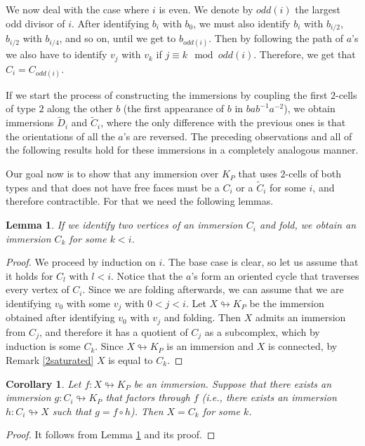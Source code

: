 \documentclass{amsart}
\theoremstyle{plain}
\newtheorem{lem}[thm]{Lemma}
\newtheorem{cor}[thm]{Corollary}
\theoremstyle{definition}
\theoremstyle{remark}
\numberwithin{equation}{section}
\begin{document}
We now deal with the case where $i$ is even.
We denote by $odd(i)$ the largest odd divisor of $i$.
After identifying $b_i$ with $b_0$, we must also identify $b_i$ with $b_{i/2}$, $b_{i/2}$ with $b_{i/4}$, and so on, until we get to $b_{odd(i)}$.
Then by following the path of $a$'s we also have to identify $v_j$ with $v_k$ if $j\equiv k \mod odd(i)$.
Therefore, we get that $C_i=C_{odd(i)}$.

If we start the process of constructing the immersions by coupling the first $2$-cells of type $2$ along the other $b$ (the first appearance of $b$ in $bab^{-1}a^{-2}$), we obtain immersions $\tilde{D}_i$ and $\tilde{C}_i$, where the only difference with the previous ones is that the orientations of all the $a$'s are reversed.
The preceding observations and all of the following results hold for these immersions in a completely analogous manner.

Our goal now is to show that any immersion over $K_P$ that uses $2$-cells of both types and that does not have free faces must be a $C_i$ or a $\tilde{C}_i$ for some $i$, and therefore contractible.
For that we need the following lemmas.

\begin{lem}\label{iC}
    If we identify two vertices of an immersion $C_i$ and fold, we obtain an immersion $C_k$ for some $k<i$.
\end{lem}
\begin{proof}
We proceed by induction on $i$.
The base case is clear, so let us assume that it holds for $C_l$ with $l<i$.
Notice that the $a$'s form an oriented cycle that traverses every vertex of $C_i$.
Since we are folding afterwards, we can assume that we are identifying $v_0$ with some $v_j$ with $0<j<i$. Let $X \looparrowright K_P$ be the immersion obtained after identifying $v_0$ with $v_j$ and folding. Then $X$ admits an immersion from $C_j$, and therefore it has a quotient of $C_j$ as a subcomplex,  which by induction is some $C_k$. Since $X \looparrowright K_P$ is an immersion and $X$ is connected, by Remark \ref{2saturated} $X$ is equal to $C_k$. 
\end{proof}



\begin{cor}\label{rigid}
    Let $f:X\looparrowright K_P$ be an immersion. Suppose that there exists an immersion $g:C_i\looparrowright K_P$ that factors through $f$ (i.e., there exists an immersion $h:C_i\looparrowright X$ such that $g=f\circ h$). Then $X=C_k$ for some $k$.
\end{cor}
\begin{proof}
    It follows from Lemma \ref{iC} and its proof.
\end{proof}
\end{document}
